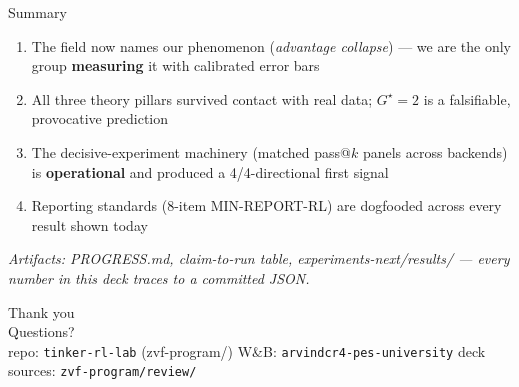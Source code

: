 \documentclass[aspectratio=169,11pt]{beamer}
\begin{document}
\begin{frame}{Summary}
  \begin{enumerate}
    \item The field now names our phenomenon (\emph{advantage collapse}) ---
          we are the only group \textbf{measuring} it with calibrated error
          bars
    \item All three theory pillars survived contact with real data;
          $G^\star{=}2$ is a falsifiable, provocative prediction
    \item The decisive-experiment machinery (matched pass@$k$ panels across
          backends) is \textbf{operational} and produced a 4/4-directional
          first signal
    \item Reporting standards (8-item MIN-REPORT-RL) are dogfooded across
          every result shown today
  \end{enumerate}
  \vspace{8pt}
  \centering
  \emph{Artifacts: PROGRESS.md, claim-to-run table, experiments-next/results/
  --- every number in this deck traces to a committed JSON.}
\end{frame}

\begin{frame}
  \centering
  {\Large Thank you}\\[10pt]
  Questions?\\[16pt]
  {\scriptsize repo: \texttt{tinker-rl-lab} (zvf-program/) \quad
   W\&B: \texttt{arvindcr4-pes-university} \quad
   deck sources: \texttt{zvf-program/review/}}
\end{frame}
\end{document}
